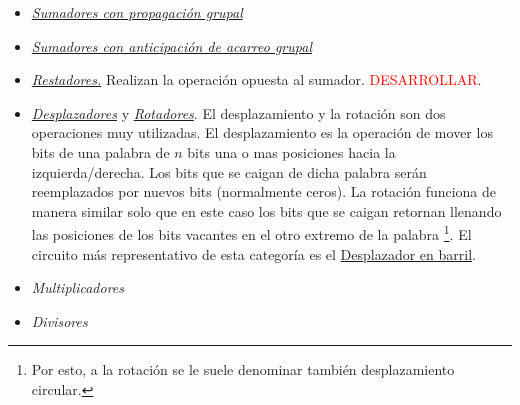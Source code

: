 \begin{itemize}
    \item \hyperlink{group-ripple_adders}{\emph{Sumadores con propagación grupal}}
    \item \hyperlink{group-carry_lookahead}{\emph{Sumadores con anticipación de acarreo grupal}}

    \item \hyperlink{substractor}{\emph{Restadores.}} Realizan la operación opuesta al sumador. \textcolor{red}{DESARROLLAR}.
    
    \item \hyperlink{shifter}{\emph{Desplazadores}} y \hyperlink{Rotator}{\emph{Rotadores}}. El desplazamiento y la rotación son dos operaciones muy utilizadas. El desplazamiento es la operación de mover los bits de una palabra de $n$ bits una o mas posiciones hacia la izquierda/derecha. Los bits que se caigan de dicha palabra serán reemplazados por nuevos bits (normalmente ceros). La rotación funciona de manera similar solo que en este caso los bits que se caigan retornan llenando las posiciones de los bits vacantes en el otro extremo de la palabra \footnote{Por esto, a la rotación se le suele denominar también desplazamiento circular.}. El circuito más representativo de esta categoría es el \hyperlink{barrel_shifter}{Desplazador en barril}.
    
    \item \emph{Multiplicadores}
    \item \emph{Divisores}
    
\end{itemize}